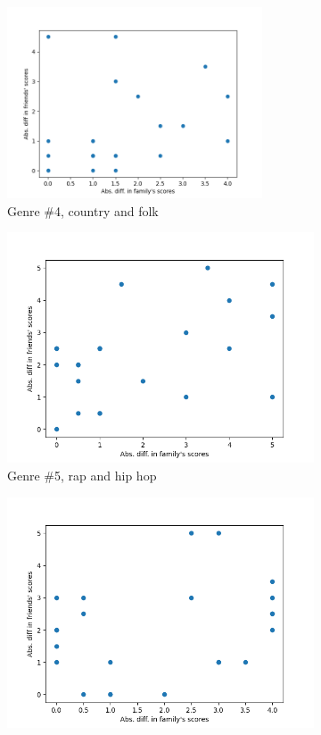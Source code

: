 \documentclass[12pt]{report}
\begin{document}
\begin{figure}[H]
\begin{centering}
\begin{subfigure}{0.35\textwidth}
        \centerline{\includegraphics[width=0.83\textwidth]{Genre 4}}
  \caption{\small Genre \#4, country and folk}
\end{subfigure}
\begin{subfigure}{0.3\textwidth}
  \centerline{\includegraphics[width=\textwidth]{Genre 5}}
  \caption{\small Genre \#5, rap and hip hop}
\end{subfigure}
\begin{subfigure}{0.3\textwidth}
  \centerline{\includegraphics[width=\textwidth]{Genre 6}}

\end{subfigure}
\end{centering}
\end{figure}
\end{document}
